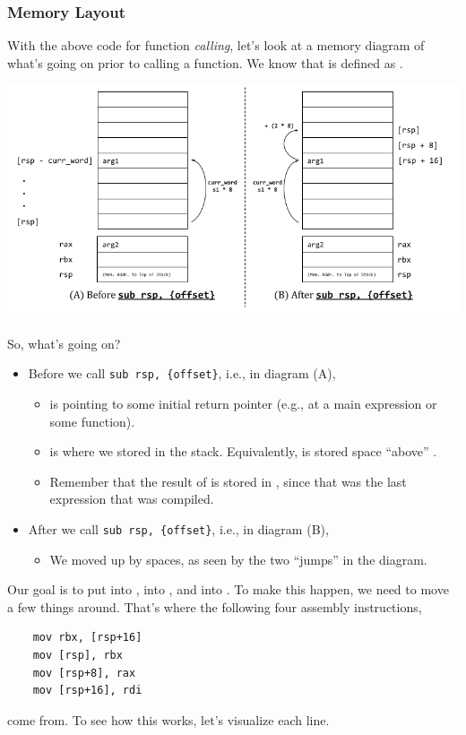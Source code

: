 \documentclass[letterpaper]{article}
\begin{document}
\subsubsection{Memory Layout}
With the above code for function \emph{calling}, let's look at a memory diagram of what's going on prior to calling a function. We know that  is defined as .
\begin{center}
    \includegraphics[scale=0.5]{../assets/function_stack_mem.png}
\end{center}

So, what's going on? 
\begin{itemize}
    \item Before we call \verb|sub rsp, {offset}|, i.e., in diagram (A), 
    \begin{itemize}
        \item \code{[rsp]} is pointing to some initial return pointer (e.g., at a main expression or some function).
        \item {} is where we stored  in the stack. Equivalently,  is stored  space ``above'' .
        \item Remember that the result of  is stored in , since that was the last expression that was compiled.
    \end{itemize}

    \item After we call \verb|sub rsp, {offset}|, i.e., in diagram (B), 
    \begin{itemize}
        \item We moved \code{[rsp]} up by  spaces, as seen by the two ``jumps'' in the diagram. 
    \end{itemize}
\end{itemize}
Our goal is to put  into \code{[rsp + 16]},  into \code{[rsp + 8]}, and  into \code{[rsp]}. To make this happen, we need to move a few things around. That's where the following four assembly instructions, 
\begin{verbatim}
    mov rbx, [rsp+16]
    mov [rsp], rbx
    mov [rsp+8], rax
    mov [rsp+16], rdi\end{verbatim}
come from. To see how this works, let's visualize each line. 
\end{document}
